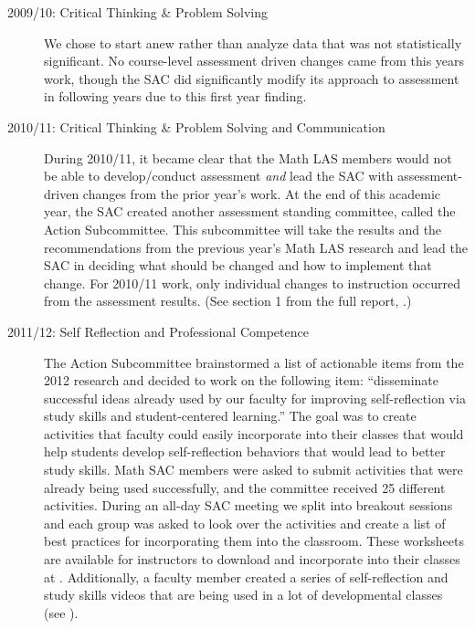 \begin{description}
	\item[2009/10: Critical Thinking \& Problem Solving]

	We chose to start anew rather than analyze data that was not statistically
	significant.  No course-level assessment driven changes came from this years
	work, though the SAC did significantly modify its approach to assessment in
	following years due to this first year finding.

	\item[2010/11:  Critical Thinking \& Problem Solving and Communication]

	During 2010/11, it became clear that the Math LAS members would not be able to
	develop/conduct assessment \emph{and} lead the SAC with assessment-driven
	changes from the prior year's work.  At the end of this academic year, the SAC
	created another assessment standing committee, called the Action Subcommittee.
	This subcommittee will take the results and the recommendations from the
	previous year's Math LAS research and lead the SAC in deciding what should be
	changed and how to implement that change.  For 2010/11 work, only individual
	changes to instruction occurred from the assessment results.  (See section 1
	from the full report, \cite{annualLASreport2010}.)

	\item[2011/12: Self Reflection and Professional Competence]

	The Action Subcommittee brainstormed a list of actionable items from the 2012
	research and decided to work on the following item: ``disseminate successful ideas
	already used by our faculty for improving self-reflection via study skills and
	student-centered learning.''  The goal was to create activities that faculty
	could easily incorporate into their classes that would help students develop
	self-reflection behaviors that would lead to better study skills.  Math SAC
	members were asked to submit activities that were already being used
	successfully, and the committee received 25 different activities.  During an
	all-day SAC meeting we split into breakout sessions and each group was asked to
	look over the activities and create a list of best practices for incorporating
	them into the classroom. These worksheets are available for instructors to
	download and incorporate into their classes at \cite{selfcenteredlearning}.
	Additionally, a faculty member created a series of self-reflection and study
	skills videos that are being used in a lot of developmental classes (see
	).


\end{description}
